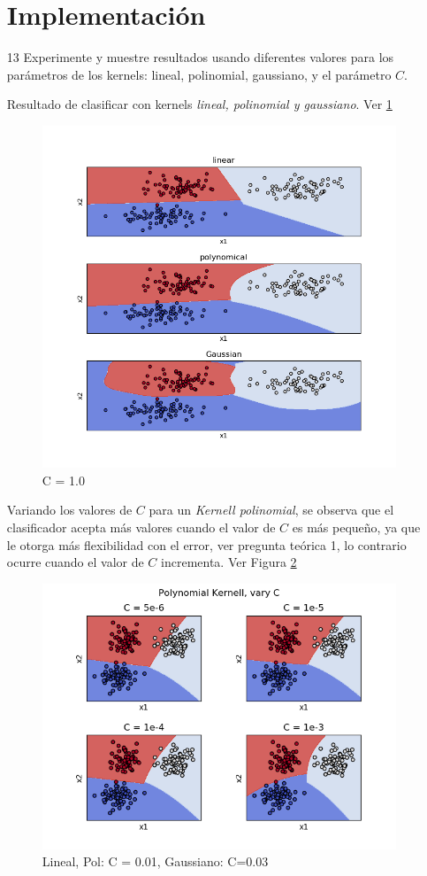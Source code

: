 \documentclass{article}
\begin{document}
\begin{itemize}
    \section{Implementación}

    \item [13] Experimente y muestre resultados usando diferentes valores para los parámetros de los kernels: lineal,
    polinomial, gaussiano, y el parámetro $C$.

    Resultado de clasificar con kernels \textit{lineal, polinomial y gaussiano}. Ver \ref{PLOT_P1_3}
    \begin{figure}[h]
        \label{PLOT_P1_3}
        \centering
        \includegraphics[width=.6\textwidth]{graphics_data1.png}
        \caption{C = 1.0}
    \end{figure}
     
    Variando los valores de $C$ para un \textit{Kernell polinomial}, se observa
    que el clasificador acepta más valores cuando el valor de $C$ es más pequeño, ya que le otorga
    más flexibilidad con el error, ver pregunta teórica 1, lo contrario ocurre cuando
    el valor de $C$ incrementa. Ver Figura \ref{PLOT_C_V}
    \begin{figure}[h]
        \label{PLOT_C_V}
        \centering
        \includegraphics[width=.6\textwidth]{variance_c.png}
        \caption{Lineal, Pol: C = 0.01, Gaussiano: C=0.03}
    \end{figure}


\end{itemize}
\end{document}
